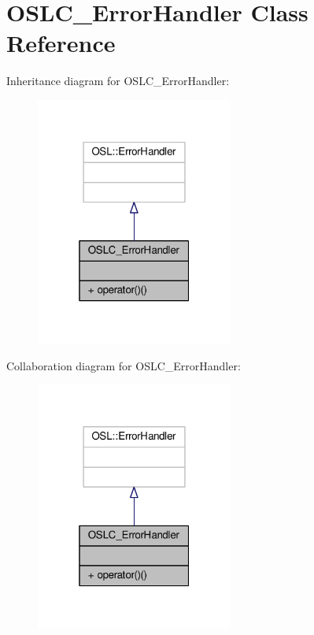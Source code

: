 \hypertarget{class_o_s_l_c___error_handler}{\section{O\-S\-L\-C\-\_\-\-Error\-Handler Class Reference}
\label{class_o_s_l_c___error_handler}
}


Inheritance diagram for O\-S\-L\-C\-\_\-\-Error\-Handler\-:
\nopagebreak
\begin{figure}[H]
\begin{center}
\leavevmode
\includegraphics[width=184pt]{class_o_s_l_c___error_handler__inherit__graph}
\end{center}
\end{figure}


Collaboration diagram for O\-S\-L\-C\-\_\-\-Error\-Handler\-:
\nopagebreak
\begin{figure}[H]
\begin{center}
\leavevmode
\includegraphics[width=184pt]{class_o_s_l_c___error_handler__coll__graph}
\end{center}
\end{figure}

